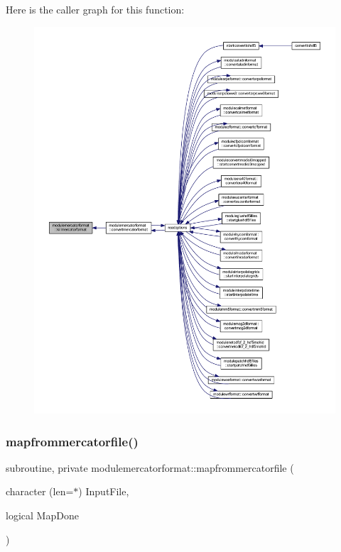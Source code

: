 Here is the caller graph for this function\+:\nopagebreak
\begin{figure}[H]
\begin{center}
\leavevmode
\includegraphics[width=350pt]{namespacemodulemercatorformat_a33fe8f1a366fc933cb9debc1dcc3debe_icgraph}
\end{center}
\end{figure}
\mbox{\label{namespacemodulemercatorformat_a99c34f27fc6fb0d01e289f47e4e8a27b}} 
\subsubsection{\texorpdfstring{mapfrommercatorfile()}{mapfrommercatorfile()}}
{\footnotesize\ttfamily subroutine, private modulemercatorformat\+::mapfrommercatorfile (\begin{DoxyParamCaption}\item[{character (len=$\ast$)}]{Input\+File,  }\item[{logical}]{Map\+Done }\end{DoxyParamCaption})\hspace{0.3cm}{\ttfamily [private]}}

